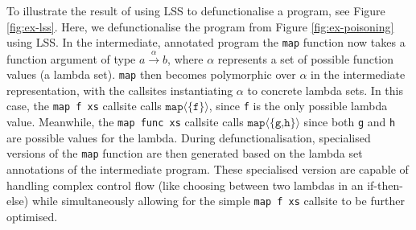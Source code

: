 \documentclass[a4paper,UKenglish,cleveref, autoref, thm-restate]{template/lipics-v2021}
\newcommand{\lss}{LSS\xspace}
\begin{document}
To illustrate the result of using \lss to defunctionalise a program, see Figure \ref{fig:ex-lss}. Here, we defunctionalise the program from Figure \ref{fig:ex-poisoning} using \lss. In the intermediate, annotated program the \texttt{map} function now takes a function argument of type $a\stackrel\alpha\to b$, where $\alpha$ represents a set of possible function values (a lambda set). \texttt{map} then becomes polymorphic over $\alpha$ in the intermediate representation, with the callsites instantiating $\alpha$ to concrete lambda sets. In this case, the \texttt{map f xs} callsite calls $\texttt{map}\langle\{\texttt{f}\}\rangle$, since \texttt{f} is the only possible lambda value. Meanwhile, the \texttt{map func xs} callsite calls $\texttt{map}\langle\{\texttt{g,h}\}\rangle$ since both \texttt{g} and \texttt{h} are possible values for the lambda. During defunctionalisation, specialised versions of the \texttt{map} function are then generated
based on the lambda set annotations of the intermediate program. These specialised version are capable of handling complex control flow (like choosing between two lambdas in an if-then-else) while simultaneously allowing for the simple \texttt{map f xs} callsite to be further optimised.
\end{document}
